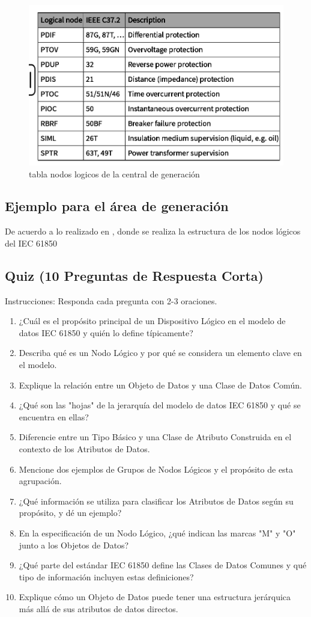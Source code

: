 \documentclass[a5paper]{book}%
\begin{document}
    \begin{figure}[H]
      \centering
      \caption{tabla nodos logicos de la central de generación}
      \label{fig:tnlcentral}
      \includegraphics[width=0.7\linewidth]{t_nl_generador}
    \end{figure}    
    
    \subsection{Ejemplo para el área de generación}
De acuerdo a lo realizado en \cite{salazar2017},  donde se realiza la estructura de  los nodos lógicos del IEC 61850



    
\subsection{Quiz (10 Preguntas de Respuesta Corta)}

Instrucciones: Responda cada pregunta con 2-3 oraciones.

\begin{enumerate}
\item ¿Cuál es el propósito principal de un Dispositivo Lógico en el modelo de datos IEC 61850 y quién lo define típicamente?
\item Describa qué es un Nodo Lógico y por qué se considera un elemento clave en el modelo.
\item Explique la relación entre un Objeto de Datos y una Clase de Datos Común.
\item ¿Qué son las "hojas" de la jerarquía del modelo de datos IEC 61850 y qué se encuentra en ellas?
\item Diferencie entre un Tipo Básico y una Clase de Atributo Construida en el contexto de los Atributos de Datos.
\item Mencione dos ejemplos de Grupos de Nodos Lógicos y el propósito de esta agrupación.
\item ¿Qué información se utiliza para clasificar los Atributos de Datos según su propósito, y dé un ejemplo?
\item En la especificación de un Nodo Lógico, ¿qué indican las marcas "M" y "O" junto a los Objetos de Datos?
\item ¿Qué parte del estándar IEC 61850 define las Clases de Datos Comunes y qué tipo de información incluyen estas definiciones?
\item Explique cómo un Objeto de Datos puede tener una estructura jerárquica más allá de sus atributos de datos directos.
  \end{enumerate}
\end{document}
